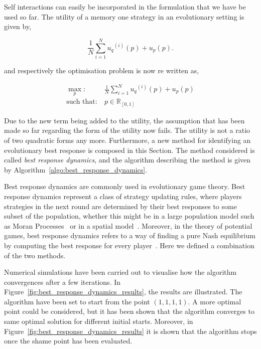 \documentclass[10pt]{article}
\newcommand{\R}{\mathbb{R}}
\begin{document}
Self interactions can easily be incorporated in the formulation that we have
be used so far. The utility of a memory one strategy in an evolutionary setting
is given by,

\begin{equation}
    \frac{1}{N} \sum\limits_{i=1} ^ {N} {u_q}^{(i)} (p) + u_p(p).
\end{equation}

and respectively the optimisation problem is now re written as,

\begin{equation}\label{eq:mo_evolutionary_optimisation}
    \begin{aligned}
    \max_p: & \ \frac{1}{N} \sum\limits_{i=1} ^ {N} {u_q}^{(i)} (p) + u_p(p)
    \\
    \text{such that}: & \ p \in \R_{[0, 1]}
    \end{aligned}
\end{equation}

Due to the new term being added to the utility, the assumption that has been
made so far regarding the form of the utility now fails. The utility is not
a ratio of two quadratic forms any more. Furthermore, a new method for
identifying an evolutionary best response is composed in this Section.
The method considered is called \textit{best response dynamics}, and the algorithm
describing the method is given by Algorithm~\ref{algo:best_response_dynamics}.

Best response dynamics are commonly used in evolutionary game theory. Best
response dynamics represent a class of strategy updating rules, where players
strategies in the next round are determined by their best responses to some
subset of the population, whether this might be in a large population model
such as Moran Processes~\cite{Knight2018} or in a spatial model~\cite{Nowak1992}.
Moreover, in the theory of potential games, best response dynamics
refers to a way of finding a pure Nash equilibrium by computing the best response for
every player~\cite{Nisan2007}. Here we defined a combination of the two methods.



Numerical simulations have been carried out to visualise how the algorithm
convergences after a few iterations. In Figure~\ref{fig:best_response_dynamics_results},
the results are illustrated. The algorithm have been set to start from the point
\((1, 1, 1, 1)\). A more optimal point could be considered, but it has been
shown that the algorithm converges to same optimal solution for different
initial starts. Moreover, in Figure~\ref{fig:best_response_dynamics_results}
it is shown that the algorithm stops once the shame point has been evaluated.
\end{document}
